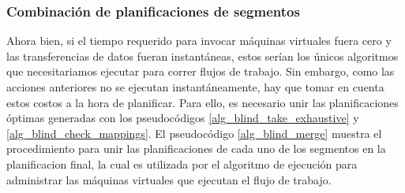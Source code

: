 \subsubsection{Combinación de planificaciones de segmentos}

Ahora bien, si el tiempo requerido para invocar máquinas virtuales fuera cero y las transferencias de datos fueran instantáneas, estos serían los únicos algoritmos que necesitariamos ejecutar para correr flujos de trabajo. Sin embargo, como las acciones anteriores no se ejecutan instantáneamente, hay que tomar en cuenta estos costos a la hora de planificar. Para ello, es necesario unir las planificaciones \'optimas generadas con los pseudoc\'odigos \ref{alg_blind_take_exhaustive} y \ref{alg_blind_check_mappings}. El pseudoc\'odigo \ref{alg_blind_merge} muestra el procedimiento para unir las planificaciones de cada uno de los segmentos en la planificacion final, la cual es utilizada por el algoritmo de ejecuci\'on para administrar las m\'aquinas virtuales que ejecutan el flujo de trabajo.


